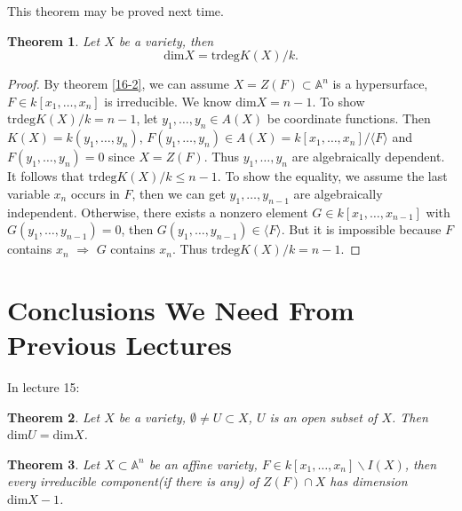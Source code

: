 \documentclass{amsart}
\theoremstyle{plain}
\newtheorem{theorem}{Theorem}
\theoremstyle{definition}
\theoremstyle{remark}
\numberwithin{equation}{section}
\begin{document}
This theorem may be proved next time.
\begin{theorem}
	Let $ X $ be a variety, then 
	$$
	\text{dim} X=\text{trdeg} K(X)/k.
	$$
\end{theorem}
\begin{proof}
	By theorem \ref{16-2}, we can assume $ X=Z(F)\subset \mathbb{A}^n $ is a hypersurface, $ F\in k[x_1,\dots,x_n] $ is irreducible. We know $ \text{dim}X=n-1 $. To show $ \text{trdeg}K(X)/k=n-1 $, let $ y_1,\dots,y_n\in A(X) $ be coordinate functions. Then $ K(X)=k(y_1,\dots,y_n) $, $ F(y_1,\dots,y_n)\in A(X)=k[x_1,\dots,x_n]/\langle F \rangle $ and $ F(y_1,\dots,y_n)=0 $ since $ X=Z(F) $. Thus $ y_1,\dots,y_n $ are algebraically dependent. It follows that $ \text{trdeg}K(X)/k\leq n-1 $. To show the equality, we assume the last variable $ x_n $ occurs in $ F $, then we can get $ y_1,\dots,y_{n-1} $ are algebraically independent. Otherwise, there exists a nonzero element $ G\in k[x_1,\dots,x_{n-1}] $ with $ G(y_1,\dots,y_{n-1})=0 $, then $ G(y_1,\dots,y_{n-1})\in \langle F\rangle  $. But it is impossible because $ F $ contains $ x_n $ $ \Rightarrow $ $ G $ contains $ x_n $. Thus $ \text{trdeg}K(X)/k=n-1 $.  
\end{proof}
\section{Conclusions We Need From Previous Lectures}
In lecture 15:
\begin{theorem}\label{15-2}
	Let $ X $ be a variety, $ \emptyset\neq U\subset X $, $ U $ is an open subset of $ X $. Then $ \text{dim}U=\text{dim}X $.
\end{theorem}
\begin{theorem}\label{15-3}
	Let $ X\subset \mathbb{A}^n $ be an affine variety, $ F\in k[x_1,\dots,x_n]\backslash I(X) $, then every irreducible component(if there is any) of $ Z(F)\cap X $ has dimension $ \text{dim}X-1 $.
\end{theorem}
\end{document}

